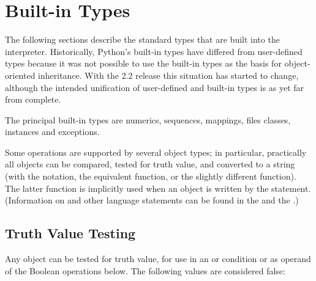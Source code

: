 \section{Built-in Types \label{types}}

The following sections describe the standard types that are built into
the interpreter.  Historically, Python's built-in types have differed
from user-defined types because it was not possible to use the built-in
types as the basis for object-oriented inheritance. With the 2.2
release this situation has started to change, although the intended
unification of user-defined and built-in types is as yet far from
complete.

The principal built-in types are numerics, sequences, mappings, files
classes, instances and exceptions.

Some operations are supported by several object types; in particular,
practically all objects can be compared, tested for truth value,
and converted to a string (with the  notation,
the equivalent  function, or the slightly different
 function).  The latter
function is implicitly used when an object is written by the
 statement.
(Information on 
and other language statements can be found in the
 and the
.)


\subsection{Truth Value Testing\label{truth}}

Any object can be tested for truth value, for use in an  or
 condition or as operand of the Boolean operations below.
The following values are considered false:

